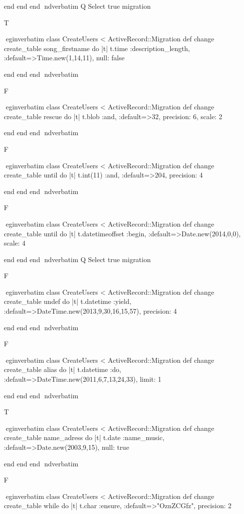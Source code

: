     end 
  end 
end
nd{verbatim}
Q
 Select true migration

T

egin{verbatim}
 class CreateUsers < ActiveRecord::Migration 
  def change 
    create_table song_firstname do |t| 
      t.time :description_length, :default=>Time.new(1,14,11), null: false
    
    end 
  end 
end
nd{verbatim}

F

egin{verbatim}
 class CreateUsers < ActiveRecord::Migration 
  def change 
    create_table rescue do |t| 
      t.blob :and, :default=>32, precision: 6, scale: 2
    
    end 
  end 
end
nd{verbatim}

F

egin{verbatim}
 class CreateUsers < ActiveRecord::Migration 
  def change 
    create_table until do |t| 
      t.int(11) :and, :default=>204, precision: 4
    
    end 
  end 
end
nd{verbatim}

F

egin{verbatim}
 class CreateUsers < ActiveRecord::Migration 
  def change 
    create_table until do |t| 
      t.datetimeoffset :begin, :default=>Date.new(2014,0,0), scale: 4
    
    end 
  end 
end
nd{verbatim}
Q
 Select true migration

F

egin{verbatim}
 class CreateUsers < ActiveRecord::Migration 
  def change 
    create_table undef do |t| 
      t.datetime :yield, :default=>DateTime.new(2013,9,30,16,15,57), precision: 4
    
    end 
  end 
end
nd{verbatim}

F

egin{verbatim}
 class CreateUsers < ActiveRecord::Migration 
  def change 
    create_table alias do |t| 
      t.datetime :do, :default=>DateTime.new(2011,6,7,13,24,33), limit: 1
    
    end 
  end 
end
nd{verbatim}

T

egin{verbatim}
 class CreateUsers < ActiveRecord::Migration 
  def change 
    create_table name_adress do |t| 
      t.date :name_music, :default=>Date.new(2003,9,15), null: true
    
    end 
  end 
end
nd{verbatim}

F

egin{verbatim}
 class CreateUsers < ActiveRecord::Migration 
  def change 
    create_table while do |t| 
      t.char :ensure, :default=>"OznZCGfz", precision: 2
    
